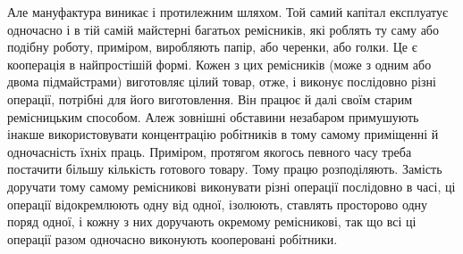 Але мануфактура виникає і протилежним шляхом. Той самий
капітал експлуатує одночасно і в тій самій майстерні багатьох
ремісників, які роблять ту саму або подібну роботу, приміром,
виробляють папір, або черенки, або голки. Це є кооперація в
найпростішій формі. Кожен з цих ремісників (може з одним
або двома підмайстрами) виготовляє цілий товар, отже, і виконує
послідовно різні операції, потрібні для його виготовлення.
Він працює й далі своїм старим ремісницьким способом.
Алеж зовнішні обставини незабаром примушують інакше використовувати
концентрацію робітників в тому самому приміщенні
й одночасність їхніх праць. Приміром, протягом якогось певного
часу треба постачити більшу кількість готового товару. Тому
працю розподіляють. Замість доручати тому самому ремісникові
виконувати різні операції послідовно в часі, ці операції відокремлюють
одну від одної, ізолюють, ставлять просторово одну поряд
одної, і кожну з них доручають окремому ремісникові, так що
всі ці операції разом одночасно виконують кооперовані робітники.
\parbreak{}  %
